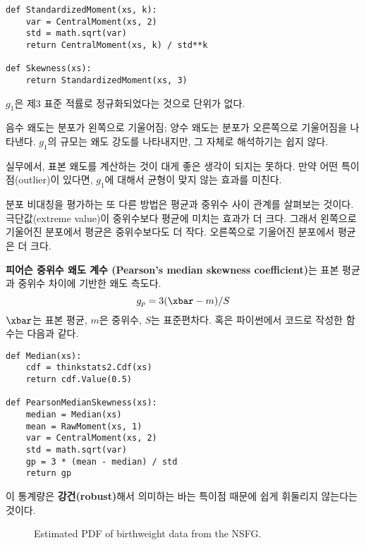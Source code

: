 \begin{verbatim}
def StandardizedMoment(xs, k):
    var = CentralMoment(xs, 2)
    std = math.sqrt(var)
    return CentralMoment(xs, k) / std**k

def Skewness(xs):
    return StandardizedMoment(xs, 3)
\end{verbatim}

$g_1$은 제3 표준 적률로 정규화되었다는 것으로 단위가 없다.

음수 왜도는 분포가 왼쪽으로 기울어짐; 양수 왜도는 분포가 오른쪽으로 기울어짐을 
나타낸다. $g_1$의 규모는 왜도 강도를 나타내지만, 그 자체로 해석하기는 쉽지 않다.

실무에서, 표본 왜도를 계산하는 것이 대게 좋은 생각이 되지는 못하다.
만약 어떤 특이점(outlier)이 있다면, $g_1$에 대해서 균형이 맞지 않는 효과를 미친다.

분포 비대칭을 평가하는 또 다른 방법은 평균과 중위수 사이 관계를 살펴보는 것이다.
극단값(extreme value)이 중위수보다 평균에 미치는 효과가 더 크다. 그래서 왼쪽으로 기울어진
분포에서 평균은 중위수보다도 더 작다. 오른쪽으로 기울어진 분포에서 평균은 더 크다.




{\bf 피어슨 중위수 왜도 계수 (Pearson's median skewness coefficient)}는
 표본 평균과 중위수 차이에 기반한 왜도 측도다.
%
\[ g_p = 3 (\xbar - m) / S \]
%
$\xbar$는 표본 평균, $m$은 중위수, $S$는 표준편차다.
혹은 파이썬에서 코드로 작성한 함수는 다음과 같다.

\begin{verbatim}
def Median(xs):
    cdf = thinkstats2.Cdf(xs)
    return cdf.Value(0.5)

def PearsonMedianSkewness(xs):
    median = Median(xs)
    mean = RawMoment(xs, 1)
    var = CentralMoment(xs, 2)
    std = math.sqrt(var)
    gp = 3 * (mean - median) / std
    return gp
\end{verbatim}

이 통계량은 {\bf 강건(robust)}해서 의미하는 바는 특이점 때문에 쉽게 휘둘리지 않는다는 것이다.


\begin{figure}
\caption{Estimated PDF of birthweight data from the NSFG.}
\label{density_totalwgt_kde}
\end{figure}

